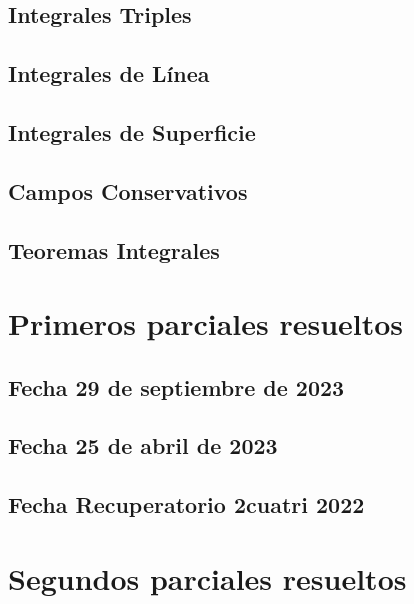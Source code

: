 \documentclass[10pt, a4paper]{report}
\theoremstyle{definition} %
\begin{document}
        \section{Integrales Triples}
            
        \section{Integrales de L\'inea}
            
        \section{Integrales de Superficie}
        \section{Campos Conservativos}
            
        \section{Teoremas Integrales}
            

    \chapter{Primeros parciales resueltos}
        \section{Fecha 29 de septiembre de 2023}
            

        \newpage
        \section{Fecha 25 de abril de 2023}
            

        \newpage
        \section{Fecha Recuperatorio 2cuatri 2022}
            


        \newpage
    \chapter{Segundos parciales resueltos}
\end{document}

